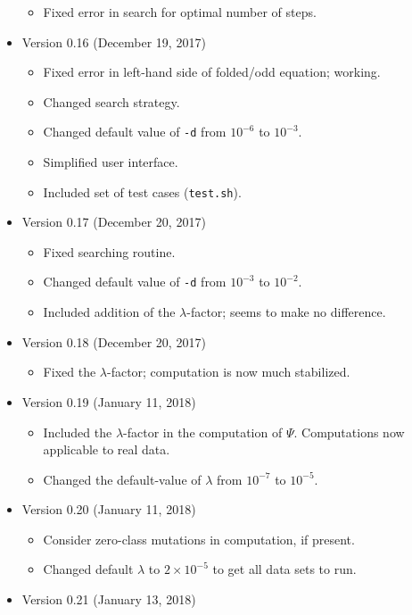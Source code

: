 \documentclass[a4paper, english]{article}
\newcommand{\ty}{\texttt}
\begin{document}
\begin{itemize}
\begin{itemize}
  \item Fixed error in search for optimal number of steps.
  \end{itemize}
\item Version 0.16 (December 19, 2017)
  \begin{itemize}
  \item Fixed error in left-hand side of folded/odd equation; working.
  \item Changed search strategy.
  \item Changed default value of \ty{-d} from $10^{-6}$ to $10^{-3}$.
  \item Simplified user interface.
  \item Included set of test cases (\ty{test.sh}).
  \end{itemize}
  \item Version 0.17 (December 20, 2017)
  \begin{itemize}
  \item Fixed searching routine.
  \item Changed default value of \ty{-d} from $10^{-3}$ to $10^{-2}$.
  \item Included addition of the $\lambda$-factor; seems to make no difference.
  \end{itemize}
\item Version 0.18 (December 20, 2017)
  \begin{itemize}
  \item Fixed the $\lambda$-factor; computation is now much
    stabilized.
  \end{itemize}
\item Version 0.19 (January 11, 2018)
  \begin{itemize}
  \item Included the $\lambda$-factor in the computation of
    $\Psi$. Computations now applicable to real data.
  \item Changed the default-value of $\lambda$ from $10^{-7}$ to $10^{-5}$.
  \end{itemize}
\item Version 0.20 (January 11, 2018)
  \begin{itemize}
  \item Consider zero-class mutations in computation, if present.
  \item Changed default $\lambda$ to $2\times 10^{-5}$ to get all data
    sets to run.
  \end{itemize}
\item Version 0.21 (January 13, 2018)
  \begin{itemize}

\end{itemize}
\end{itemize}
\end{document}
